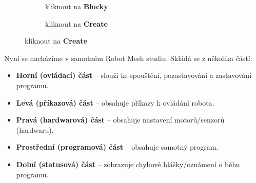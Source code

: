 \documentclass[../main.tex]{subfiles}
\begin{document}
\begin{figure}[h!]
\begin{subfigure}{.3\textwidth}
			\caption{kliknout na \textbf{Blocky}}%
		\end{subfigure} \hspace{.045\textwidth}%
		\begin{subfigure}{.3\textwidth}%
			\centering%
			\caption{kliknout na \textbf{Create}}%
		\end{subfigure}%
	\end{figure}

	\newpage

	Nyní se nacházíme v samotném Robot Mesh studiu. Skládá se z několika částí:

	\begin{itemize}
		\item \textbf{Horní (ovládací) část} -- slouží ke spouštění, pozastavování a zastavování programu.
		\item \textbf{Levá (příkazová) část} -- obsahuje příkazy k ovládání robota.
		\item \textbf{Pravá (hardwarová) část} -- obsahuje nastavení motorů/senzorů (hardwaru).
		\item \textbf{Prostřední (programová) část} -- obsahuje samotný program.
		\item \textbf{Dolní (statusová) část} -- zobrazuje chybové hlášky/oznámení o běhu programu.
	\end{itemize}
\end{document}
